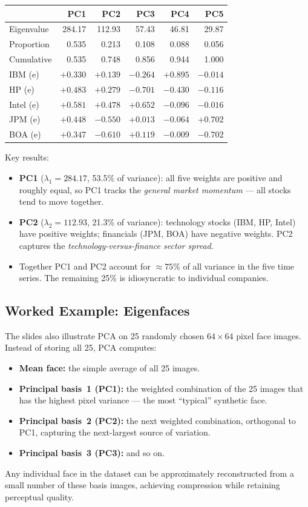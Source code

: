 \documentclass[11pt]{article}
\begin{document}
\begin{center}
\begin{tabular}{lrrrrr}
\toprule
 & PC1 & PC2 & PC3 & PC4 & PC5 \\
\midrule
Eigenvalue  & 284.17 & 112.93 & 57.43 & 46.81 & 29.87 \\
Proportion  & 0.535  & 0.213  & 0.108 & 0.088 & 0.056 \\
Cumulative  & 0.535  & 0.748  & 0.856 & 0.944 & 1.000 \\
\midrule
IBM (e)     & $+0.330$ & $+0.139$ & $-0.264$ & $+0.895$ & $-0.014$ \\
HP (e)      & $+0.483$ & $+0.279$ & $-0.701$ & $-0.430$ & $-0.116$ \\
Intel (e)   & $+0.581$ & $+0.478$ & $+0.652$ & $-0.096$ & $-0.016$ \\
JPM (e)     & $+0.448$ & $-0.550$ & $+0.013$ & $-0.064$ & $+0.702$ \\
BOA (e)     & $+0.347$ & $-0.610$ & $+0.119$ & $-0.009$ & $-0.702$ \\
\bottomrule
\end{tabular}
\end{center}

Key results:
\begin{itemize}
    \item \textbf{PC1} ($\lambda_1 = 284.17$, 53.5\% of variance): all five weights are positive and roughly equal, so PC1 tracks the \emph{general market momentum} --- all stocks tend to move together.
    \item \textbf{PC2} ($\lambda_2 = 112.93$, 21.3\% of variance): technology stocks (IBM, HP, Intel) have positive weights; financials (JPM, BOA) have negative weights. PC2 captures the \emph{technology-versus-finance sector spread}.
    \item Together PC1 and PC2 account for $\approx 75\%$ of all variance in the five time series. The remaining 25\% is idiosyncratic to individual companies.
\end{itemize}

\subsection{Worked Example: Eigenfaces}
The slides also illustrate PCA on 25 randomly chosen $64 \times 64$ pixel face images. Instead of storing all 25, PCA computes:
\begin{itemize}
    \item \textbf{Mean face:} the simple average of all 25 images.
    \item \textbf{Principal basis~1 (PC1):} the weighted combination of the 25 images that has the highest pixel variance --- the most ``typical'' synthetic face.
    \item \textbf{Principal basis~2 (PC2):} the next weighted combination, orthogonal to PC1, capturing the next-largest source of variation.
    \item \textbf{Principal basis~3 (PC3):} and so on.
\end{itemize}
Any individual face in the dataset can be approximately reconstructed from a small number of these basis images, achieving compression while retaining perceptual quality.
\end{document}
